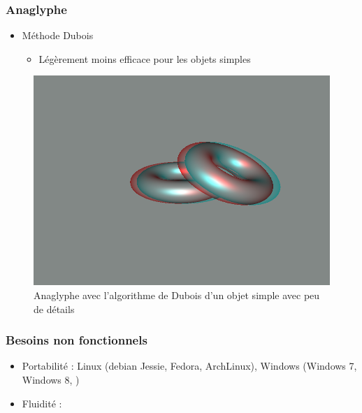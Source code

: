\documentclass{beamer}
\begin{document}
%
% 
\begin{frame}
\frametitle{Anaglyphe}
\begin{itemize}[label=$\bullet$]
\item Méthode Dubois \cite{algoDubois}
	\begin{itemize}[label=$\circ$]
	\item Légèrement moins efficace pour les objets simples 
	\end{itemize}
\end{itemize}
\begin{figure}
\centering
\includegraphics[scale=0.35]{donuts_dubois.png}
\caption{Anaglyphe avec l'algorithme de Dubois d'un objet simple avec peu de détails}
\end{figure}
\end{frame}

\begin{frame}
\frametitle{Besoins non fonctionnels}
\begin{itemize}[label=$\bullet$]
 	\item Portabilité : Linux (debian Jessie, Fedora, ArchLinux), Windows (Windows 7, Windows 8, )
	\item Fluidité : 
\end{itemize}

\end{frame}

\end{document}
